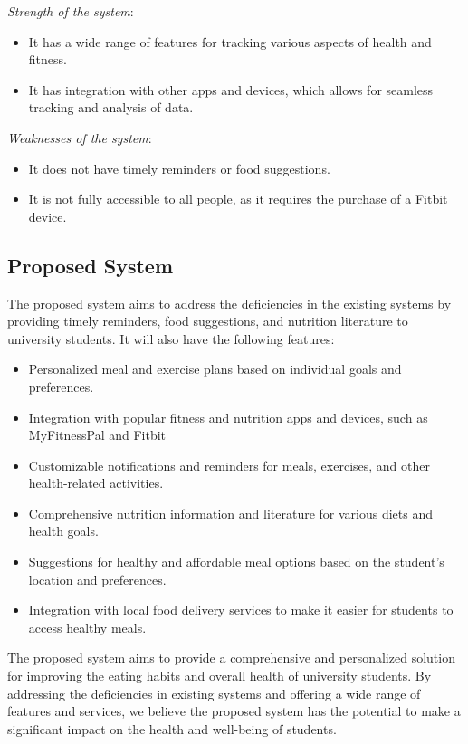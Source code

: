 \documentclass{article}
\begin{document}
\textit{Strength of the system}:
\begin{itemize}
    \item It has a wide range of features for tracking various aspects of health and fitness.
    \item It has integration with other apps and devices, which allows for seamless tracking and analysis of data.
\end{itemize}

\textit{Weaknesses of the system}:
\begin{itemize}
    \item It does not have timely reminders or food suggestions.
    \item It is not fully accessible to all people, as it requires the purchase of a Fitbit device.
\end{itemize}

\subsection{Proposed System}
The proposed system aims to address the deficiencies in the existing systems by providing timely reminders, food suggestions, and nutrition literature to university students. It will also have the following features:

\begin{itemize}
    \item Personalized meal and exercise plans based on individual goals and preferences.
    \item Integration with popular fitness and nutrition apps and devices, such as MyFitnessPal and Fitbit
\item Customizable notifications and reminders for meals, exercises, and other health-related activities.
\item Comprehensive nutrition information and literature for various diets and health goals.
\item Suggestions for healthy and affordable meal options based on the student's location and preferences.
\item Integration with local food delivery services to make it easier for students to access healthy meals.
\end{itemize}

The proposed system aims to provide a comprehensive and personalized solution for improving the eating habits and overall health of university students. By addressing the deficiencies in existing systems and offering a wide range of features and services, we believe the proposed system has the potential to make a significant impact on the health and well-being of students.
\end{document}
